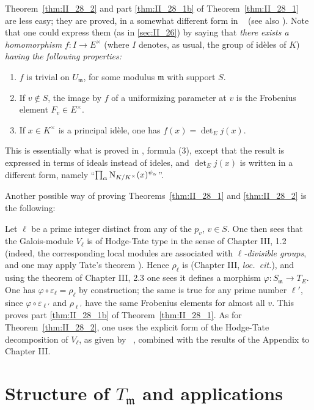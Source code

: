 Theorem~\ref{thm:II_28_2} and part \ref{thm:II_28_1b} of
Theorem~\ref{thm:II_28_1} are less easy; they are proved, in a somewhat
different form in \citeauthor{34}~\cite{34} (see also \cite{32}). Note that one
could express them (as in \ref{sec:II_26}) by saying that \emph{there exists a
homomorphism} $f\colon I \to E^\times$ (where $I$ denotes, as usual, the group
of idèles of $K$) \emph{having the following properties:}
\begin{enumerate}
\item $f$ is trivial on $U_{\mathfrak{m}}$, for some modulus $\mathfrak{m}$
	with support $S$.
\item If $v \notin S$, the image by $f$ of a uniformizing parameter at
	$v$ is the Frobenius element $F_v \in E^\times$.
\item If $x \in K^\times$ is a principal idèle, one has $f(x) = \det_E j(x)$.
\end{enumerate}
This is essentially what is proved in \cite[148]{34}, formula (3),
except that the result is expressed in terms of ideals instead of
ideles, and $\det_E j(x)$ is written in a different form, namely
``$ \prod_{\alpha} \operatorname{N}_{K/K^\times}(x)^{\psi_\alpha} $''.

\begin{obs}
Another possible way of proving Theorems~\ref{thm:II_28_1} and
\ref{thm:II_28_2} is the following:

Let $\ell$ be a prime integer distinct from any of the $p_v$, $v \in S$.  One
then sees that the Galois-module $V_\ell$ is of Hodge-Tate type in the sense of
Chapter III, 1.2 (indeed, the corresponding local modules
\dpage
are associated with \emph{$\ell$-divisible groups}, and one may apply Tate's
theorem \cite{39}). Hence $\rho_\ell$ is  (Chapter
III, \emph{loc.\ cit.}), and using the theorem of Chapter III, 2.3 one sees it
defines a morphism $\varphi \colon S_{\mathfrak{m}} \to T_E$. One has
$\varphi\circ\varepsilon_\ell = \rho_\ell$ by construction; the same is true
for any prime number $\ell'$, since $\varphi\circ\varepsilon_{\ell'}$ and
$\rho_{\ell'}$ have the same Frobenius elements for almost all $v$. This proves
part \ref{thm:II_28_1b} of Theorem~\ref{thm:II_28_1}. As for
Theorem~\ref{thm:II_28_2}, one uses the explicit form of the Hodge-Tate
decomposition of $V_\ell$, as given by \citeauthor{39}~\cite{39}, combined with
the results of the Appendix to Chapter III.
\end{obs}

\section{Structure of \texorpdfstring{$T_{\mathfrak{m}}$}{Tm} and applications}

